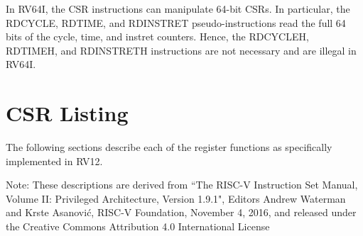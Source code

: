 In RV64I, the CSR instructions can manipulate 64-bit CSRs. In
particular, the RDCYCLE, RDTIME, and RDINSTRET pseudo-instructions read
the full 64 bits of the cycle, time, and instret counters. Hence, the
RDCYCLEH, RDTIMEH, and RDINSTRETH instructions are not necessary and are
illegal in RV64I.

\section{CSR Listing}\label{csr-listing}

The following sections describe each of the register functions as
specifically implemented in RV12.

Note: These descriptions are derived from ``The RISC-V Instruction Set
Manual, Volume II: Privileged Architecture, Version 1.9.1", Editors
Andrew Waterman and Krste Asanović, RISC-V Foundation, November 4, 2016,
and released under the Creative Commons Attribution 4.0 International
License

